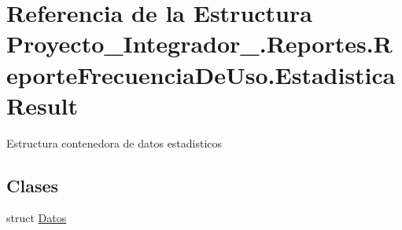 \hypertarget{struct_proyecto___integrador__3_1_1_reportes_1_1_reporte_frecuencia_de_uso_1_1_estadistica_result}{\section{Referencia de la Estructura Proyecto\-\_\-\-Integrador\-\_.\-Reportes.\-Reporte\-Frecuencia\-De\-Uso.\-Estadistica\-Result}
\label{struct_proyecto___integrador__3_1_1_reportes_1_1_reporte_frecuencia_de_uso_1_1_estadistica_result}
}


Estructura contenedora de datos estadisticos  


\subsection*{Clases}
\begin{DoxyCompactItemize}
\item 
struct \hyperlink{struct_proyecto___integrador__3_1_1_reportes_1_1_reporte_frecuencia_de_uso_1_1_estadistica_result_1_1_datos}{Datos}
\end{DoxyCompactItemize}

